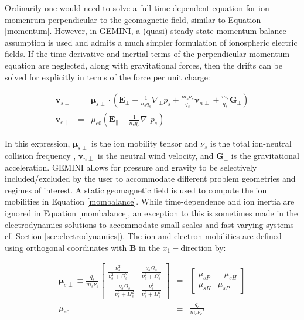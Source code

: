 \documentclass[11pt,letterpaper]{article}
\begin{document}
Ordinarily one would need to solve a full time dependent equation for ion momenrum perpendicular to the geomagnetic field, similar to Equation \ref{momentum}.  However, in GEMINI, a (quasi) steady state momentum balance assumption is used and admits a much simpler formulation of ionospheric electric fields.  If the time-derivative and inertial terms of the perpendicular momentum equation are neglected, along with gravitational forces, then the drifts can be solved for explicitly in terms of the force per unit charge:
\begin{linenomath*} \begin{eqnarray}
\mathbf{v}_{s\perp} &=& \boldsymbol{\mu}_{s\perp} \cdot \left( \mathbf{E}_\perp - \frac{1}{n_s q_s} \nabla_\perp p_s + \frac{m_s \nu_s}{q_s} \mathbf{v}_{n\perp} + \frac{m_s}{q_s} \mathbf{G}_\perp  \right) \label{mombalance} \\
\mathbf{v}_{e\parallel} &=& \mu_{e0} \left( \mathbf{E}_\parallel - \frac{1}{n_e q_e} \nabla_\parallel p_e \right) \label{mombalancepar}
\end{eqnarray} \end{linenomath*}
In this expression, $\boldsymbol{\mu}_{s\perp}$ is the ion mobility tensor and $\nu_s$ is the total ion-neutral collision frequency \citep{Zettergren:2012}, $\mathbf{v}_{n\perp}$ is the neutral wind velocity, and $\mathbf{G}_\perp$ is the gravitational acceleration. GEMINI allows for pressure and gravity to be selectively included/excluded by the user to accommodate different problem geometries and regimes of interest.  A static geomagnetic field is used to compute the ion mobilities in Equation \ref{mombalance}.  While time-dependence and ion inertia are ignored in Equation \ref{mombalance}, an exception to this is sometimes made in the electrodynamics solutions to accommodate small-scales and fast-varying systems- cf. Section \ref{sec:electrodynamics}).  The ion and electron mobilities are defined using orthogonal coordinates with $\mathbf{B}$ in the $x_1-$direction by:
\begin{linenomath*} \begin{eqnarray}
\boldsymbol{\mu}_{s\perp}
\equiv
\frac{q_s}{m_s \nu_s}  \left[ \begin{array}{cc}
  \frac{\nu_{s}^2}{\nu_{s}^2 + \Omega_s^2} & \frac{\nu_{s} \Omega_s}{\nu_{s}^2+\Omega_s^2} \\
  - \frac{\nu_{s} \Omega_s}{\nu_{s}^2+\Omega_s^2} &  \frac{\nu_{s}^2}{\nu_{s}^2 + \Omega_s^2}
\end{array} \right]
&=&
\left[ \begin{array}{cc}
  \mu_{sP} & -\mu_{sH} \\
  \mu_{sH} &  \mu_{sP}
\end{array} \right]
\label{mus} \\
\mu_{e0} & \equiv & \frac{q_e}{m_e \nu_e'}
\end{eqnarray} \end{linenomath*}
\end{document}
